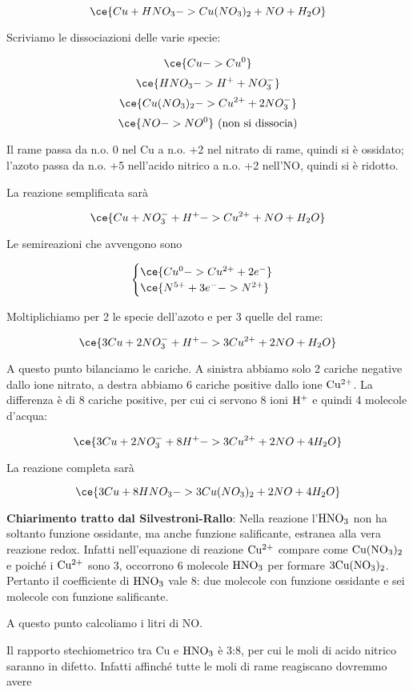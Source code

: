 $$\ce{Cu + HNO_3 -> Cu(NO_3)_2 + NO + H_2O}$$

Scriviamo le dissociazioni delle varie specie:

$$\ce{Cu -> Cu^0}$$
$$\ce{HNO_3 -> H^+ + NO_3^-}$$
$$\ce{Cu(NO_3)_2 -> Cu^{2+} + 2NO_3^-}$$
$$\ce{NO -> NO^0} \text{ (non si dissocia)}$$

Il rame passa da n.o. 0 nel Cu a n.o. +2 nel nitrato di rame, quindi si è ossidato; l'azoto passa da n.o. +5 nell'acido nitrico a n.o. +2 nell'NO, quindi si è ridotto.

La reazione semplificata sarà

$$\ce{Cu + NO_3^- + H^+ -> Cu^{2+} + NO + H_2O}$$

Le semireazioni che avvengono sono

$$\begin{cases}
    \ce{Cu^0 -> Cu^{2+} + 2e^-}\\
    \ce{N^{5+} + 3e^- -> N^{2+}}
\end{cases}$$

Moltiplichiamo per 2 le specie dell'azoto e per 3 quelle del rame:

$$\ce{3Cu + 2NO_3^- + H^+ -> 3Cu^{2+} + 2NO + H_2O}$$

A questo punto bilanciamo le cariche. A sinistra abbiamo solo 2 cariche negative dallo ione nitrato, a destra abbiamo 6 cariche positive dallo ione $\rm Cu^{2+}$. La differenza è di 8 cariche positive, per cui ci servono 8 ioni $\rm H^+$ e quindi 4 molecole d'acqua:

$$\ce{3Cu + 2NO_3^- + 8H^+ -> 3Cu^{2+} + 2NO + 4H_2O}$$

La reazione completa sarà

$$\ce{3Cu + 8HNO_3 -> 3Cu(NO_3)_2 + 2NO + 4H_2O}$$

\textbf{Chiarimento tratto dal Silvestroni-Rallo}: Nella reazione l'$\rm HNO_3$ non ha soltanto funzione ossidante, ma anche funzione salificante, estranea alla vera reazione redox. Infatti nell'equazione di reazione $\rm Cu^{2+}$ compare come $\rm Cu(NO_3)_2$ e poiché i $\rm Cu^{2+}$ sono 3, occorrono 6 molecole $\rm HNO_3$ per formare $\rm 3Cu(NO_3)_2$. Pertanto il coefficiente di $\rm HNO_3$ vale 8: due molecole con funzione ossidante e sei molecole con funzione salificante.

A questo punto calcoliamo i litri di NO.

Il rapporto stechiometrico tra Cu e $\rm HNO_3$ è 3:8, per cui le moli di acido nitrico saranno in difetto. Infatti affinché tutte le moli di rame reagiscano dovremmo avere

